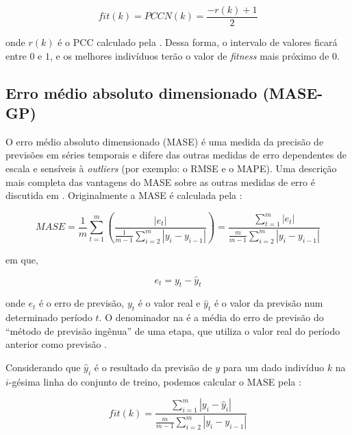 \begin{equation}
fit(k) = PCCN(k) = \frac{-r(k)+1}{2}
\label{Equacao536}
\end{equation}

\noindent onde $r(k)$ é o \ac{PCC} calculado pela . Dessa forma, o intervalo de valores ficará entre $0$ e 
$1$, e os melhores indivíduos terão o valor de \emph{fitness} mais próximo de $0$.


\subsection{Erro médio absoluto dimensionado (MASE-GP)}
\label{MASEGP}

O erro médio absoluto dimensionado (\ac{MASE}) é uma medida da precisão de previsões em séries temporais 
e difere das outras medidas de erro dependentes de escala e sensíveis à \emph{outliers} (por exemplo: o \ac{RMSE} e o 
\ac{MAPE}). 
Uma descrição mais completa das vantagens do \ac{MASE} sobre as outras medidas de erro é discutida em \citep{Hyndman2006}.
Originalmente a \ac{MASE} é calculada pela :

\begin{equation}
MASE = \frac{1}{m}\sum_{t=1}^m\left(\frac{\left| e_t \right|}{\frac{1}{m-1}\sum_{i=2}^m \left| y_i-y_{i-1}\right|} \right) = \frac{\sum_{t=1}^{m} \left| e_t \right|}{\frac{m}{m-1}\sum_{i=2}^m \left| y_i-y_{i-1}\right|}
\label{Equacao537}
\end{equation}

\noindent em que,

\begin{equation}
e_t = y_t - \hat{y}_t
\label{Equacao538}
\end{equation}

\noindent onde $e_t$ é o erro de previsão, $y_t$ é o valor real e $\hat{y}_t$ é o valor da previsão num determinado período $t$. O denominador 
na  é a média do erro de previsão do ``método de previsão ingênua'' de uma etapa, que utiliza o valor real do período 
anterior como previsão \citep{Hyndman2008}.

Considerando que $\hat{y}_i$ é o resultado da previsão de $y$ para um dado indivíduo $k$ na $i$-gésima linha do conjunto de treino, 
podemos calcular o \ac{MASE} pela :

\begin{equation}
fit(k) = \frac{\sum_{i=1}^{m} \left|y_i - \hat{y}_i\right|}{\frac{m}{m-1}\sum_{i=2}^m \left|y_i-y_{i-1}\right|}
\label{Equacao539}
\end{equation}

